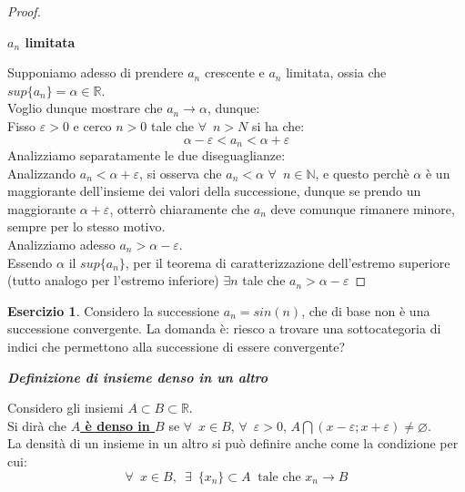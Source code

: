 \documentclass{article}
\theoremstyle{definition}
\newtheorem{ex}{Esercizio}
\begin{document}
\begin{proof}
\begin{center}
    \textbf{\textit{$a_n$} limitata}
\end{center}
Supponiamo adesso di prendere $a_n$ crescente e $a_n$ limitata, ossia che $sup\{a_n\}=\alpha \in \mathbb{R}$.
\\
Voglio dunque mostrare che $a_n \longrightarrow \alpha$, dunque:
\\
Fisso $\varepsilon>0$ e cerco $n>0$ tale che $\forall \,\,\, n>N$ si ha che:
\begin{equation}
    \alpha - \varepsilon < a_n <\alpha + \varepsilon
\end{equation}
Analizziamo separatamente le due diseguaglianze:
\\
Analizzando $a_n< \alpha + \varepsilon$, si osserva che $a_n < \alpha$ $\forall \,\,\, n \in \mathbb{N}$, e questo perchè $\alpha$ è un maggiorante dell'insieme dei valori della successione, dunque se prendo un maggiorante $\alpha + \varepsilon$, otterrò chiaramente che $a_n$ deve comunque rimanere minore, sempre per lo stesso motivo.
\\
Analizziamo adesso $a_n > \alpha -\varepsilon$.
\\
Essendo $\alpha$ il $sup\{a_n\}$, per il teorema di caratterizzazione dell'estremo superiore (tutto analogo per l'estremo inferiore) $\exists n$ tale che $a_n > \alpha -\varepsilon$
\end{proof}
\begin{ex}
    Considero la successione $a_n=sin(n)$, che di base non è una successione convergente. La domanda è: riesco a trovare una sottocategoria di indici che permettono alla successione di essere convergente?
\end{ex}
\newpage
\begin{center}
    \textbf{\textit{Definizione di insieme denso in un altro}}
\end{center}
    Considero gli insiemi $A \subset B \subset \mathbb{R}$.
    \\
    Si dirà che \underline{\textbf{$A$ è denso in $B$}} se $\forall \,\,\, x \in B$, $\forall \,\,\, \varepsilon>0$, $A \bigcap (x-\varepsilon;x+\varepsilon)\neq \varnothing$.
    \\
    La densità di un insieme in un altro si può definire anche come la condizione per cui:
    \begin{equation}
        \forall \,\,\, x \in B, \,\,\, \exists \,\,\, \{x_n\}\subset A \,\,\ \mbox{tale che}\,\, x_n\longrightarrow B
    \end{equation}
\end{document}
